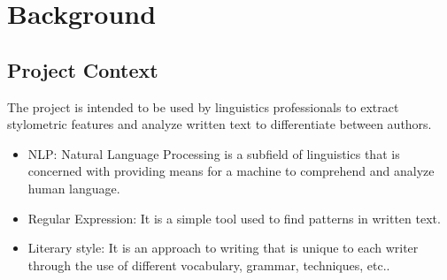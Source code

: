 \chapter{Background}

\section{Project Context}
The project is intended to be used by linguistics professionals to extract stylometric features and analyze written text to differentiate between authors.

\begin{itemize}
    \item NLP: Natural Language Processing is a subfield of linguistics that is concerned with providing means for a machine to comprehend and analyze human language.
    \item Regular Expression: It is a simple tool used to find patterns in written text.
    \item Literary style: It is an approach to writing that is unique to each writer through the use of different vocabulary, grammar, techniques, etc..
\end{itemize}
